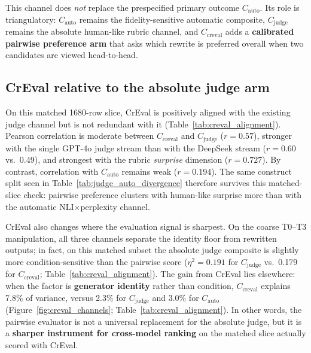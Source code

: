 \documentclass[sigconf,nonacm]{acmart}
\begin{document}
This channel does \emph{not} replace the prespecified primary outcome $C_{\mathrm{auto}}$. Its role is triangulatory: $C_{\mathrm{auto}}$ remains the fidelity-sensitive automatic composite, $C_{\mathrm{judge}}$ remains the absolute human-like rubric channel, and $C_{\mathrm{creval}}$ adds a \textbf{calibrated pairwise preference arm} that asks which rewrite is preferred overall when two candidates are viewed head-to-head.

\subsection{CrEval relative to the absolute judge arm}

On this matched 1680-row slice, CrEval is positively aligned with the existing judge channel but is not redundant with it (Table~\ref{tab:creval_alignment}). Pearson correlation is moderate between $C_{\mathrm{creval}}$ and $C_{\mathrm{judge}}$ ($r{=}0.57$), stronger with the single GPT-4o judge stream than with the DeepSeek stream ($r{=}0.60$ vs.\ 0.49), and strongest with the rubric \emph{surprise} dimension ($r{=}0.727$). By contrast, correlation with $C_{\mathrm{auto}}$ remains weak ($r{=}0.194$). The same construct split seen in Table~\ref{tab:judge_auto_divergence} therefore survives this matched-slice check: pairwise preference clusters with human-like surprise more than with the automatic NLI$\times$perplexity channel.

CrEval also changes where the evaluation signal is sharpest. On the coarse T0--T3 manipulation, all three channels separate the identity floor from rewritten outputs; in fact, on this matched subset the absolute judge composite is slightly more condition-sensitive than the pairwise score ($\eta^2{=}0.191$ for $C_{\mathrm{judge}}$ vs.\ 0.179 for $C_{\mathrm{creval}}$; Table~\ref{tab:creval_alignment}). The gain from CrEval lies elsewhere: when the factor is \textbf{generator identity} rather than condition, $C_{\mathrm{creval}}$ explains 7.8\% of variance, versus 2.3\% for $C_{\mathrm{judge}}$ and 3.0\% for $C_{\mathrm{auto}}$ (Figure~\ref{fig:creval_channels}; Table~\ref{tab:creval_alignment}). In other words, the pairwise evaluator is not a universal replacement for the absolute judge, but it is a \textbf{sharper instrument for cross-model ranking} on the matched slice actually scored with CrEval.
\end{document}
